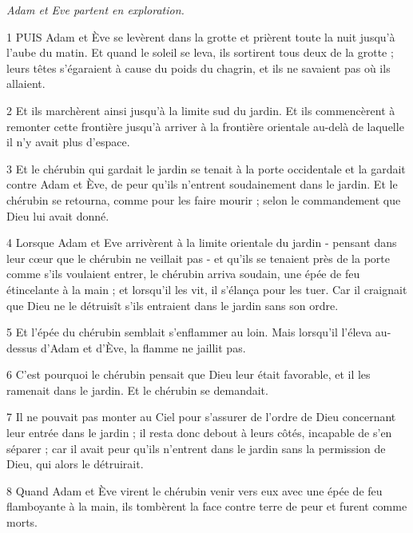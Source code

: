 \par \textit{Adam et Eve partent en exploration.}

\par 1 PUIS Adam et Ève se levèrent dans la grotte et prièrent toute la nuit jusqu'à l'aube du matin. Et quand le soleil se leva, ils sortirent tous deux de la grotte ; leurs têtes s'égaraient à cause du poids du chagrin, et ils ne savaient pas où ils allaient.

\par 2 Et ils marchèrent ainsi jusqu'à la limite sud du jardin. Et ils commencèrent à remonter cette frontière jusqu'à arriver à la frontière orientale au-delà de laquelle il n'y avait plus d'espace.

\par 3 Et le chérubin qui gardait le jardin se tenait à la porte occidentale et la gardait contre Adam et Ève, de peur qu'ils n'entrent soudainement dans le jardin. Et le chérubin se retourna, comme pour les faire mourir ; selon le commandement que Dieu lui avait donné.

\par 4 Lorsque Adam et Eve arrivèrent à la limite orientale du jardin - pensant dans leur cœur que le chérubin ne veillait pas - et qu'ils se tenaient près de la porte comme s'ils voulaient entrer, le chérubin arriva soudain, une épée de feu étincelante à la main ; et lorsqu'il les vit, il s'élança pour les tuer. Car il craignait que Dieu ne le détruisît s'ils entraient dans le jardin sans son ordre.

\par 5 Et l'épée du chérubin semblait s'enflammer au loin. Mais lorsqu’il l’éleva au-dessus d’Adam et d’Ève, la flamme ne jaillit pas.

\par 6 C'est pourquoi le chérubin pensait que Dieu leur était favorable, et il les ramenait dans le jardin. Et le chérubin se demandait.

\par 7 Il ne pouvait pas monter au Ciel pour s'assurer de l'ordre de Dieu concernant leur entrée dans le jardin ; il resta donc debout à leurs côtés, incapable de s'en séparer ; car il avait peur qu'ils n'entrent dans le jardin sans la permission de Dieu, qui alors le détruirait.

\par 8 Quand Adam et Ève virent le chérubin venir vers eux avec une épée de feu flamboyante à la main, ils tombèrent la face contre terre de peur et furent comme morts.

